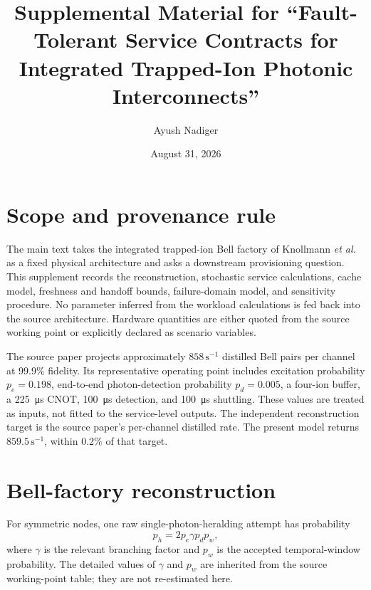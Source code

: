\documentclass[aps,prx,preprint,superscriptaddress,nofootinbib,longbibliography]{revtex4-2}
\begin{document}
\title{Supplemental Material for ``Fault-Tolerant Service Contracts for Integrated Trapped-Ion Photonic Interconnects''}
\author{Ayush Nadiger}
\date{August 31, 2026}
\maketitle

\section{Scope and provenance rule}
The main text takes the integrated trapped-ion Bell factory of Knollmann \emph{et al.} as a fixed physical architecture and asks a downstream provisioning question. This supplement records the reconstruction, stochastic service calculations, cache model, freshness and handoff bounds, failure-domain model, and sensitivity procedure. No parameter inferred from the workload calculations is fed back into the source architecture. Hardware quantities are either quoted from the source working point or explicitly declared as scenario variables.

The source paper projects approximately $858\,\mathrm{s}^{-1}$ distilled Bell pairs per channel at 99.9\% fidelity. Its representative operating point includes excitation probability $p_e=0.198$, end-to-end photon-detection probability $p_d=0.005$, a four-ion buffer, a \SI{225}{\micro s} CNOT, \SI{100}{\micro s} detection, and \SI{100}{\micro s} shuttling. These values are treated as inputs, not fitted to the service-level outputs. The independent reconstruction target is the source paper's per-channel distilled rate. The present model returns $859.5\,\mathrm{s}^{-1}$, within 0.2\% of that target.

\section{Bell-factory reconstruction}
For symmetric nodes, one raw single-photon-heralding attempt has probability
\begin{equation}
 p_h=2p_e\gamma p_dp_w,
\end{equation}
where $\gamma$ is the relevant branching factor and $p_w$ is the accepted temporal-window probability. The detailed values of $\gamma$ and $p_w$ are inherited from the source working-point table; they are not re-estimated here.
\end{document}
